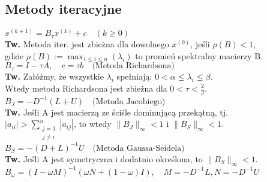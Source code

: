 \documentclass[a4paper,twocolumn]{article}
\begin{document}
\subsection{Metody iteracyjne}
${x}^{(k+1)} = B_{\tau} {x}^{(k)} + {c} \hspace{1em} (k \geq 0)$\\
\textbf{Tw.} Metoda iter. jest zbieżna dla dowolnego $x^{(0)}$, jeśli $\rho(B)<1$,\\
gdzie $\rho(B):=\max_{1 \leq i \leq n} (\lambda_i)$ to promień spektralny macierzy B.\\
$B_{\tau} = I - \tau A, \hspace{1em} c = \tau b \hspace{1em} \mbox{(Metoda Richardsona)}$\\
\textbf{Tw.} Załóżmy, że wszystkie $\lambda_i$ spełniają: $0 < \alpha \leq \lambda_i \leq \beta$.\\
Wtedy metoda Richardsona jest zbieżna dla $0 < \tau < \frac{2}{\beta}$.\\
$B_J = -D^{-1}(L+U) \hspace{1em} \mbox{(Metoda Jacobiego)}$\\
\textbf{Tw.} Jeśli A jest macierzą ze ściśle dominującą przekątną, tj.\\
$|a_{ii}|>\sum\limits_{\begin{smallmatrix}j=1\\j\neq i\end{smallmatrix}}^{n}|a_{ij}|$, to wtedy $\|B_J\|_\infty < 1$ i $\|B_S\|_\infty < 1$.\\
$B_S = -(D+L)^{-1}U \hspace{1em} \mbox{(Metoda Gaussa-Seidela)}$\\
\textbf{Tw.} Jeśli A jest symetryczna i dodatnio określona, to $\|B_S\|_\infty < 1$.\\
$B_{\omega} = (I - \omega M)^{-1} (\omega N + (1 - \omega)I), \hspace{1em} M = -D^{-1}L, N = -D^{-1} U$
\end{document}
